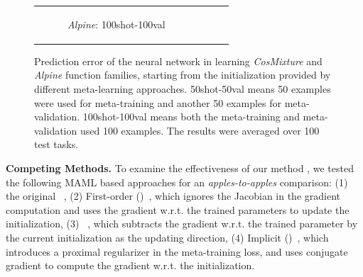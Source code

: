 {\begin{figure}[t]
\begin{tabular}[c]{cccc}
\begin{subfigure}[t]{0.25\textwidth}
			\caption{\small \textit{Alpine}: 100shot-100val}
		\end{subfigure} 
	\end{tabular}
	\vspace{-0.1in}
	\caption{\small Prediction error of the neural network in learning \textit{CosMixture} and \textit{Alpine} function families, starting from the initialization provided by different meta-learning approaches.  50shot-50val means 50 examples were used for meta-training and another 50 examples for meta-validation. 100shot-100val means both the meta-training and meta-validation used  100 examples. The results were averaged over 100 test tasks. } 	
	\label{fig:synthetic}
\end{figure}
}

\noindent \textbf{Competing Methods.} To examine the effectiveness of our method \ours,  we tested the following MAML based approaches for an \textit{apples-to-apples} comparison: (1) the original \maml~\citep{finn2017model}, (2) First-order \maml (\fomaml)~\citep{finn2017model}, which ignores the Jacobian in the gradient computation and uses the gradient  w.r.t. the trained parameters to update the initialization, (3) \rap~\citep{nichol2018first}, which subtracts the gradient w.r.t. the trained parameter by the current initialization as the updating direction, (4) Implicit \maml (\imaml)~\citep{rajeswaran2019meta}, which introduces a proximal regularizer in the meta-training loss, and uses conjugate gradient to compute the gradient w.r.t. the initialization. 

